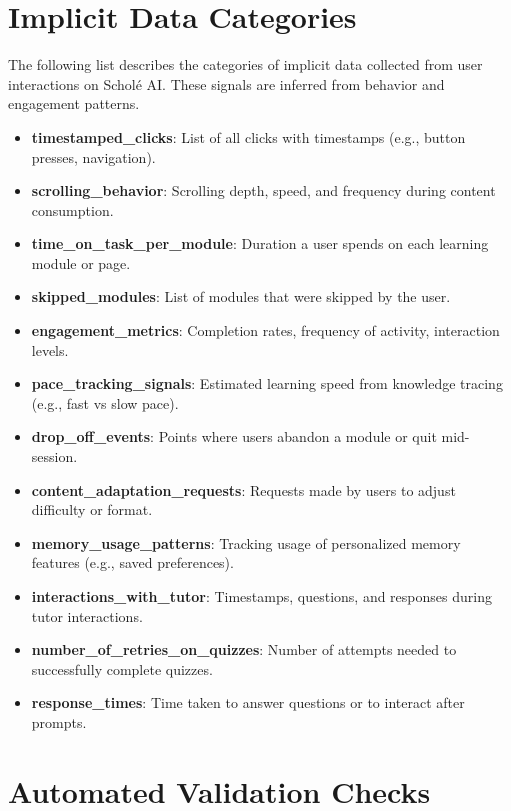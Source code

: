 \section{Implicit Data Categories}
\label{appendix:implicit_data}

The following list describes the categories of implicit data collected from user interactions on Schol\'e AI. These signals are inferred from behavior and engagement patterns.

{\footnotesize
\begin{itemize}
    \item \textbf{timestamped\_clicks}: List of all clicks with timestamps (e.g., button presses, navigation).
    \item \textbf{scrolling\_behavior}: Scrolling depth, speed, and frequency during content consumption.
    \item \textbf{time\_on\_task\_per\_module}: Duration a user spends on each learning module or page.
    \item \textbf{skipped\_modules}: List of modules that were skipped by the user.
    \item \textbf{engagement\_metrics}: Completion rates, frequency of activity, interaction levels.
    \item \textbf{pace\_tracking\_signals}: Estimated learning speed from knowledge tracing (e.g., fast vs slow pace).
    \item \textbf{drop\_off\_events}: Points where users abandon a module or quit mid-session.
    \item \textbf{content\_adaptation\_requests}: Requests made by users to adjust difficulty or format.
    \item \textbf{memory\_usage\_patterns}: Tracking usage of personalized memory features (e.g., saved preferences).
    \item \textbf{interactions\_with\_tutor}: Timestamps, questions, and responses during tutor interactions.
    \item \textbf{number\_of\_retries\_on\_quizzes}: Number of attempts needed to successfully complete quizzes.
    \item \textbf{response\_times}: Time taken to answer questions or to interact after prompts.
\end{itemize}
}

\section{Automated Validation Checks}
\label{appendix:validation_checks}

